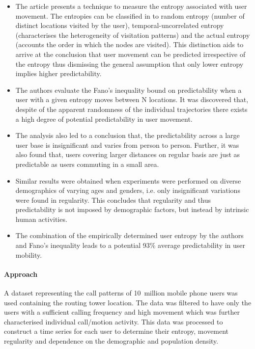 \begin{itemize}

	\item The article presents a technique to measure the entropy associated with user movement. 
	The entropies can be classified in to random entropy (number of distinct locations visited by the user), 
	temporal-uncorrelated entropy (characterises the heterogeneity of visitation patterns) and the actual
	entropy (accounts the order in which the nodes are visited). This distinction aids to arrive at the 
	conclusion that user movement can be predicted irrespective of the entropy thus dismissing the 
	general assumption that only lower entropy implies higher predictability. 
		
	\item The authors evaluate the Fano's inequality bound on predictability when a user with a given entropy 
	moves between N locations. It was discovered that, despite of the apparent randomness of the individual
	trajectories there exists a high degree of potential predictability in user movement. 
	
	\item The analysis also led to a conclusion that, the predictability across a large user base is insignificant 
	and varies from person to person. Further, it was also found that, users covering larger distances on regular 
	basis are just as predictable as users commuting in a small area. 
	
	\item Similar results were obtained when experiments were performed on diverse demographics of varying ages and 
	genders, i.e. only insignificant variations were found in regularity. This concludes that regularity and thus 
	predictability is not imposed by demographic factors, but instead by intrinsic human activities. 
	
	\item The combination of the empirically determined user entropy by the authors and Fano's inequality leads 
	to a potential 93\% average predictability in user mobility. 
	
\end{itemize}

\paragraph{Approach}

A dataset representing the call patterns of 10~million mobile phone users was used containing the routing tower 
location. The data was filtered to have only the users with a sufficient calling frequency and high 
movement which was further characterised individual call/motion activity. This data was processed to construct 
a time series for each user to determine their entropy, movement regularity and dependence on the demographic
and population density. 
 

